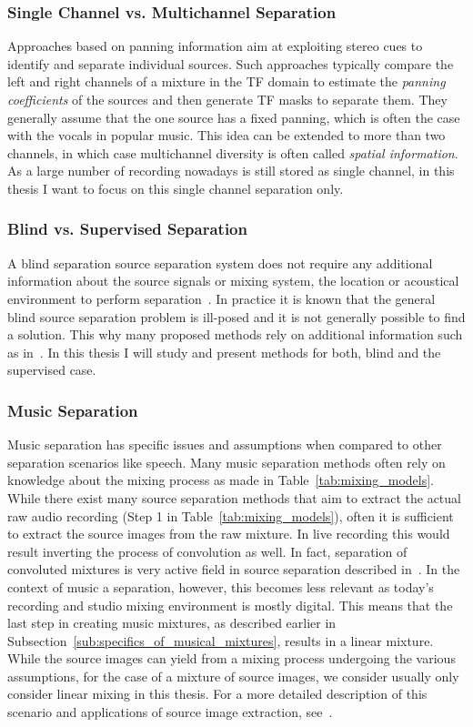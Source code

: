 \subsubsection{Single Channel vs. Multichannel Separation}
Approaches based on panning information aim at exploiting stereo cues to identify and separate individual sources. Such approaches typically compare the left and right channels of a mixture in the TF domain to estimate the \textit{panning coefficients} of the sources and then generate TF masks to separate them. They generally assume that the one source has a fixed panning, which is often the case with the vocals in popular music. This idea can be extended to more than two channels, in which case multichannel diversity is often called \textit{spatial information}.
As a large number of recording nowadays is still stored as single channel, in this thesis I want to focus on this single channel separation only.

\subsubsection{Blind vs. Supervised Separation}
A blind separation source separation system does not require any additional information about the source signals or mixing system, the location or acoustical environment to perform separation~\cite{makino07}.
In practice it is known that the general blind source separation problem is ill-posed and it is not generally possible to find a solution.
This why many proposed methods rely on additional information such as in~\cite{liutkus13, ewert14}.
In this thesis I will study and present methods for both, blind and the supervised case.

\subsubsection{Music Separation}
Music separation has specific issues and assumptions when compared to other separation scenarios like speech.
Many music separation methods often rely on knowledge about the mixing process as made in Table~\ref{tab:mixing_models}.
While there exist many source separation methods that aim to extract the actual raw audio recording (Step 1 in  Table~\ref{tab:mixing_models}), often it is sufficient to extract the source images from the raw mixture.
In live recording this would result inverting the process of convolution as well.
In fact, separation of convoluted mixtures is very active field in source separation described in~\cite{pedersen07}.
In the context of music a separation, however, this becomes less relevant as today's recording and studio mixing environment is mostly digital.
This means that the last step in creating music mixtures, as described earlier in Subsection~\ref{sub:specifics_of_musical_mixtures}, results in a linear mixture.
While the source images can yield from a mixing process undergoing the various assumptions, for the case of a mixture of source images, we consider usually only consider linear mixing in this thesis.
For a more detailed description of this scenario and applications of source image extraction, see~\cite{sturmel12}.\\

